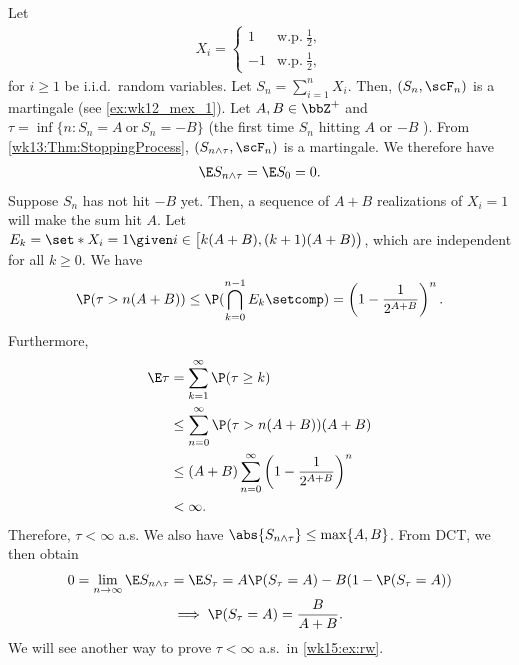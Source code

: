 \documentclass[../aipt.tex]{subfiles}
\begin{document}
\begin{Example}\label{wk13:ex:rw}
Let
\begin{align*}
X_i = 
\begin{cases} 
1 & \text{w.p.}\ \frac{1}{2}, \\ 
-1 & \text{w.p.}\ \frac{1}{2}, 
\end{cases}
\end{align*}
for $i \geq 1$ be i.i.d.\ random variables. Let $S_n = \sum_{i=1}^n X_i$. Then, $\left(S_n, \scF_n \right)$ is a martingale (see \cref{ex:wk12_mex_1}).
Let $A, B \in \bbZ^+$ and $\tau = \inf \{n: S_n=A \ \text{or}\ S_n=-B\}$ (the first time $S_n$ hitting $A$ or $-B$ ). From \cref{wk13:Thm:StoppingProcess}, $\left(S_{n \wedge \tau}, \scF_n\right)$ is a martingale. We therefore have
\begin{align*}
\E S_{n \wedge \tau} = \E S_0 = 0.
\end{align*}
Suppose $S_n$ has not hit $-B$ yet. Then, a sequence of $A+B$ realizations of $X_i=1$ will make the sum hit $A$. Let $E_k = \set*{X_i=1\given i \in \big[k(A+B), (k+1)(A+B)\big)}$, which are independent for all $k\geq0$. We have
\begin{align*}
\P(\tau > n(A+B)) \leq \P(\bigcap_{k=0}^{n-1} E_k\setcomp) = \left(1 - \frac{1}{2^{A+B}}\right)^n.
\end{align*}
Furthermore, 
\begin{align*}
\E \tau &= \sum_{k=1}^\infty \P(\tau \geq k) \\
&\leq \sum_{n=0}^\infty \P(\tau > n(A+B))(A+B) \\
&\leq (A+B) \sum_{n=0}^\infty \left(1 - \frac{1}{2^{A+B}}\right)^n \\
&< \infty. 
\end{align*}
Therefore, $\tau < \infty$ a.s. We also have $\abs{S_{n \wedge \tau}} \leq \max \{A, B\}$. From DCT, we then obtain
\begin{align*}
0= \lim_{n \to \infty} \E S_{n \wedge \tau}
&= \E S_\tau 
= A\P(S_\tau = A) - B(1 - \P(S_\tau = A))\\
&\implies
\P(S_\tau = A) = \frac{B}{A+B}.
\end{align*}
We will see another way to prove $\tau<\infty$ a.s.\ in \cref{wk15:ex:rw}.
\end{Example}
\end{document}
